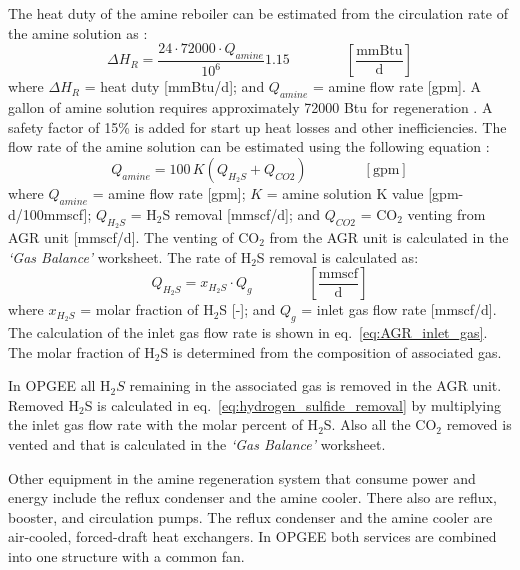 \documentclass[11pt]{report}
\newcommand{\sheet}[1]{\textit{`{#1}'}}
\newcommand{\eqnunit}[1]{\quad\quad \scriptstyle{\left[\text{#1}\right]}}
\newcommand{\eqnunitfrac}[2]{\quad\quad \scriptstyle{\left[\frac{\text{#1}}{\text{#2}}\right]}}
\begin{document}
The heat duty of the amine reboiler can be estimated from the circulation rate of the amine solution as \cite[p. 119---originally Jones and Perry, 1973]{Manning1991}:  
\begin{equation} \label{eq:gas_AGR_heat}
\Delta H_{R}= \frac{24\cdot72000 \cdot Q_{amine}}{10^6}  1.15 \quad\quad\eqnunitfrac{mmBtu}{d}
\end{equation}
where $\Delta H_{R}$ = heat duty [mmBtu/d]; and $Q_{amine}$ = amine flow rate [gpm].   A gallon of amine solution requires approximately 72000 Btu for regeneration \cite{Jones1973}. A safety factor of 15\% is added for start up heat losses and other inefficiencies. The flow rate of the amine solution can be estimated using the following equation \cite[p. 115]{Manning1991}:  
\begin{equation} \label{eq:amine_flow_rate}
Q_{amine}=100\,K (Q_{ H_{2}S}+  Q_{CO2}) \quad\quad\eqnunit{gpm}
\end{equation}
where $Q_{amine}$ = amine flow rate [gpm]; $K$ = amine solution K value [gpm-d/100mmscf]; $Q_{H_{2}S}$ = H$_{2}$S removal [mmscf/d]; and $Q_{CO2}$ = CO$_{2}$ venting from AGR unit [mmscf/d]. The venting of CO$_{2}$ from the AGR unit is calculated in the \sheet{Gas Balance} worksheet. The rate of H$_{2}$S removal is calculated as:
\begin{equation} \label{eq:hydrogen_sulfide_removal}
Q_{ H_{2}S} = x_{H_{2}S}\cdot Q_{g} \quad\quad\eqnunitfrac{mmscf}{d}
\end{equation}
where $x_{H_{2}S}$ = molar fraction of H$_{2}$S [-]; and $Q_{g}$ = inlet gas flow rate [mmscf/d]. The calculation of the inlet gas flow rate is shown in eq.\ \eqref{eq:AGR_inlet_gas}. The molar fraction of H$_{2}$S is determined from the composition of associated gas.

In OPGEE all H$_{2}S$ remaining in the associated gas is removed in the AGR unit. Removed H$_2$S is calculated in eq.\ \eqref{eq:hydrogen_sulfide_removal} by multiplying the inlet gas flow rate with the molar percent of H$_{2}$S. Also all the CO$_{2}$ removed is vented and that is calculated in the \sheet{Gas Balance} worksheet.

Other equipment in the amine regeneration system that consume power and energy include the reflux condenser and the amine cooler. There also are reflux, booster, and circulation pumps. The reflux condenser and the amine cooler are air-cooled, forced-draft heat exchangers. In OPGEE both services are combined into one structure with a common fan.
\end{document}
